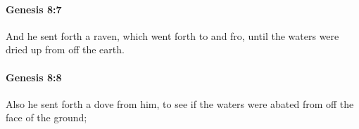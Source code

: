 		\paragraph{Genesis 8:7} %
			\label{GENESIS-8-7}

			And he sent forth a raven, which went forth to and fro, until the waters were dried up from off the earth.


		\paragraph{Genesis 8:8} %
			\label{GENESIS-8-8}

			Also he sent forth a dove from him, to see if the waters were abated from off the face of the ground;


